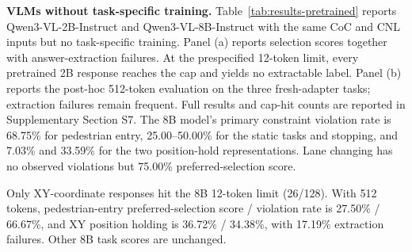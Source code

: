 \noindent\textbf{VLMs without task-specific training.}
Table~\ref{tab:results-pretrained} reports Qwen3-VL-2B-Instruct and
Qwen3-VL-8B-Instruct with the same CoC and CNL inputs but no task-specific
training. Panel (a) reports selection scores together with answer-extraction
failures. At the prespecified 12-token limit, every pretrained 2B response
reaches the cap and yields no extractable label. Panel (b) reports the
post-hoc 512-token evaluation on the three fresh-adapter tasks; extraction
failures remain frequent. Full results and cap-hit counts are reported in
Supplementary Section S7. The 8B model's primary constraint violation rate
is 68.75\% for pedestrian entry, 25.00--50.00\% for the static tasks and
stopping, and 7.03\% and 33.59\% for the two position-hold representations.
Lane changing has no observed violations but 75.00\% preferred-selection score.

Only XY-coordinate responses hit the 8B 12-token limit (26/128). With 512
tokens, pedestrian-entry preferred-selection score / violation rate is
27.50\% / 66.67\%, and XY position holding is 36.72\% / 34.38\%, with
17.19\% extraction failures. Other 8B task scores are unchanged.

